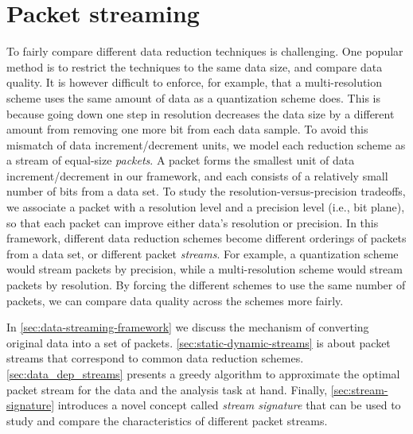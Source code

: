 \section{Packet streaming}\label{sec:terminologies}

To fairly compare different data reduction techniques is challenging. One popular method is to
restrict the techniques to the same data size, and compare data quality. It is however difficult to
enforce, for example, that a multi-resolution scheme uses the same amount of data as a quantization
scheme does. This is because going down one step in resolution decreases the data size by a
different amount from removing one more bit from each data sample. To avoid this mismatch of data
increment/decrement units, we model each reduction scheme as a stream of equal-size \emph{packets}.
A packet forms the smallest unit of data increment/decrement in our framework, and each consists of
a relatively small number of bits from a data set. To study the resolution-versus-precision
tradeoffs, we associate a packet with a resolution level and a precision level (i.e., bit plane), so
that each packet can improve either data's resolution or precision. In this framework, different
data reduction schemes become different orderings of packets from a data set, or different packet
\emph{streams}. For example, a quantization scheme would stream packets by precision, while a
multi-resolution scheme would stream packets by resolution. By forcing the different schemes to use
the same number of packets, we can compare data quality across the schemes more fairly.

In \autoref{sec:data-streaming-framework} we discuss the mechanism of converting original data into
a set of packets. \autoref{sec:static-dynamic-streams} is about packet streams that correspond to
common data reduction schemes. \autoref{sec:data_dep_streams} presents a greedy algorithm to
approximate the optimal packet stream for the data and the analysis task at hand. Finally,
\autoref{sec:stream-signature} introduces a novel concept called \emph{stream signature} that can be
used to study and compare the characteristics of different packet streams.

